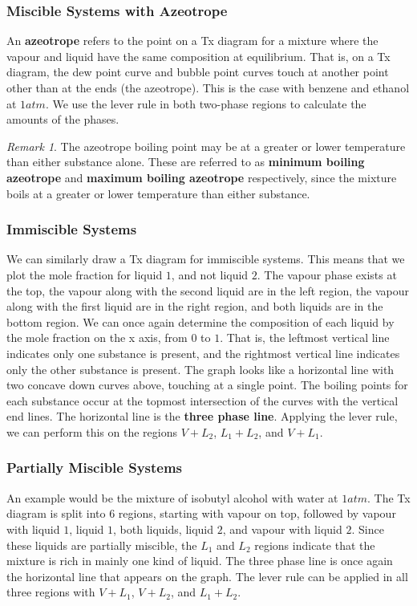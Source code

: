 \documentclass[11pt]{article}
\theoremstyle{plain} %
\theoremstyle{definition}
\theoremstyle{example}
\theoremstyle{remark}
\newtheorem*{remark}{Remark}
\begin{document}
\subsubsection{Miscible Systems with Azeotrope}
An \textbf{azeotrope} refers to the point on a Tx diagram for a mixture where the vapour and liquid have the same composition at equilibrium. That is, on a Tx diagram, the dew point curve and bubble point curves touch at another point other than at the ends (the azeotrope). This is the case with benzene and ethanol at $1atm$. We use the lever rule in both two-phase regions to calculate the amounts of the phases.
\begin{remark}
The azeotrope boiling point may be at a greater or lower temperature than either substance alone. These are referred to as \textbf{minimum boiling azeotrope} and \textbf{maximum boiling azeotrope} respectively, since the mixture boils at a greater or lower temperature than either substance. \end{remark}

\subsubsection{Immiscible Systems}
We can similarly draw a Tx diagram for immiscible systems. This means that we plot the mole fraction for liquid $1$, and not liquid $2$. The vapour phase exists at the top, the vapour along with the second liquid are in the left region, the vapour along with the first liquid are in the right region, and both liquids are in the bottom region. We can once again determine the composition of each liquid by the mole fraction on the x axis, from $0$ to $1$. That is, the leftmost vertical line indicates only one substance is present, and the rightmost vertical line indicates only the other substance is present. The graph looks like a horizontal line with two concave down curves above, touching at a single point. The boiling points for each substance occur at the topmost intersection of the curves with the vertical end lines. The horizontal line is the \textbf{three phase line}. Applying the lever rule, we can perform this on the regions $V+L_2$, $L_1+L_2$, and $V + L_1$. 

\subsubsection{Partially Miscible Systems}
An example would be the mixture of isobutyl alcohol with water at $1atm$. The Tx diagram is split into 6 regions, starting with vapour on top, followed by vapour with liquid $1$, liquid $1$, both liquids, liquid $2$, and vapour with liquid $2$. Since these liquids are partially miscible, the $L_1$ and $L_2$ regions indicate that the mixture is rich in mainly one kind of liquid. The three phase line is once again the horizontal line that appears on the graph. The lever rule can be applied in all three regions with $V+ L_1$, $V+L_2$, and $L_1+L_2$. 
\end{document}
